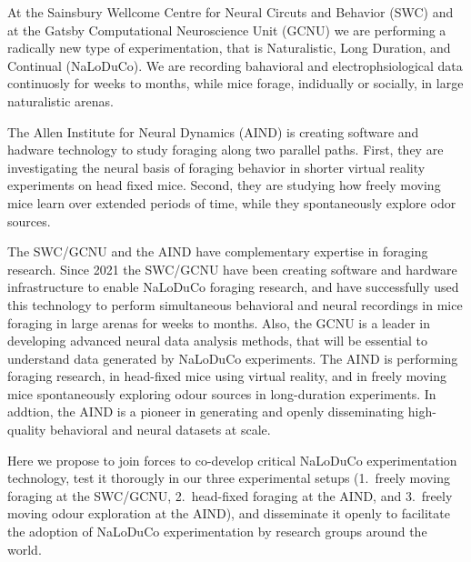 At the Sainsbury Wellcome Centre for Neural Circuts and Behavior (SWC) and at
the Gatsby Computational Neuroscience Unit (GCNU) we are performing a radically
new type of experimentation, that is Naturalistic, Long Duration, and Continual
(NaLoDuCo). We are recording bahavioral and electrophsiological data
continuosly for weeks to months, while mice forage, indidually or socially, in
large naturalistic arenas.

The Allen Institute for Neural Dynamics (AIND) is creating software and hadware
technology to study foraging along two parallel paths. First, they are
investigating the neural basis of foraging behavior in shorter virtual reality
experiments on head fixed mice. Second, they are studying how freely moving
mice learn over extended periods of time, while they spontaneously explore odor
sources.

The SWC/GCNU and the AIND have complementary expertise in foraging research.
%
Since 2021 the SWC/GCNU have been creating software and hardware infrastructure
to enable NaLoDuCo foraging research, and have successfully used this
technology to perform simultaneous behavioral and neural recordings in mice
foraging in large arenas for weeks to months.
%
Also, the GCNU is a leader in developing advanced neural data analysis methods,
that will be essential to understand data generated by NaLoDuCo experiments.
%
The AIND is performing foraging research, in head-fixed mice using virtual
reality, and in freely moving mice spontaneously exploring odour sources
in long-duration experiments.
%
In addtion, the AIND is a pioneer in generating and openly disseminating
high-quality behavioral and neural datasets at scale.

Here we propose to join forces to co-develop critical NaLoDuCo experimentation
technology, test it thorougly in our three experimental setups (1.\ freely
moving foraging at the SWC/GCNU, 2.\ head-fixed foraging at the AIND, and 3.\
freely moving odour exploration at the AIND), and disseminate it openly to
facilitate the adoption of NaLoDuCo experimentation by research groups around
the world.

